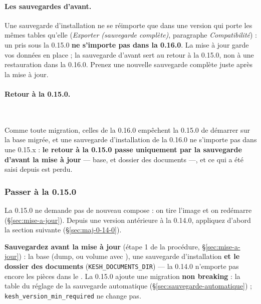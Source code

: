 \documentclass[a4paper,11pt,oneside]{article}
\begin{document}
\paragraph{Les sauvegardes d'avant.} Une sauvegarde d'installation ne se réimporte que dans une version qui porte les mêmes tables qu'elle (\emph{Exporter (sauvegarde complète)}, paragraphe \emph{Compatibilité}) : un  pris sous la 0.15.0 \textbf{ne s'importe pas dans la 0.16.0}. La mise à jour garde vos données en place ; la sauvegarde d'avant sert au retour à la 0.15.0, non à une restauration dans la 0.16.0. Prenez une nouvelle sauvegarde complète juste après la mise à jour.

\paragraph{Retour à la 0.15.0.}\label{sec:maj-0-16-0-retour}\mbox{}\\
\begin{sloppypar}
Comme toute migration, celles de la 0.16.0 empêchent la 0.15.0 de démarrer sur la base migrée, et une sauvegarde d'installation de la 0.16.0 ne s'importe pas dans une 0.15.x : \textbf{le retour à la 0.15.0 passe uniquement par la sauvegarde d'avant la mise à jour} --- base,  et dossier des documents ---, et ce qui a été saisi depuis est perdu.
\end{sloppypar}

\subsubsection{Passer à la 0.15.0}\label{sec:maj-0-15-0}

La 0.15.0 ne demande pas de nouveau compose : on tire l'image et on redémarre (\S\ref{sec:mise-a-jour}). Depuis une version antérieure à la 0.14.0, appliquez d'abord la section suivante (\S\ref{sec:maj-0-14-0}).

\begin{sloppypar}
\textbf{Sauvegardez avant la mise à jour} (étape 1 de la procédure, \S\ref{sec:mise-a-jour}) : la base (dump, ou volume avec ), une sauvegarde d'installation  \textbf{et le dossier des documents} (\texttt{KESH\_DOCUMENTS\_DIR}) --- la 0.14.0 n'emporte pas encore les pièces dans le . La 0.15.0 ajoute une migration \textbf{non breaking} : la table du réglage de la sauvegarde automatique (\S\ref{sec:sauvegarde-automatique}) ; \texttt{kesh\_version\_min\_required} ne change pas.
\end{sloppypar}
\end{document}
